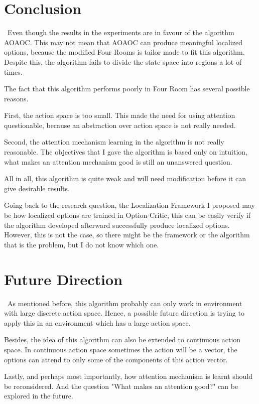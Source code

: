 \documentclass{article}
\begin{document}
	\section{Conclusion}
	\qquad \ Even though the results in the experiments are in favour of the algorithm AOAOC. This may not mean that AOAOC can produce meaningful localized options, because the modified Four Rooms is tailor made to fit this algorithm. Despite this, the algorithm fails to divide the state space into regions a lot of times.
	
	\quad The fact that this algorithm performs poorly in Four Room has several possible reasons.
	
	\quad First, the action space is too small. This made the need for using attention questionable, because an abstraction over action space is not really needed.
	
	\quad Second, the attention mechanism learning in the algorithm is not really reasonable. The objectives that I gave the algorithm is based only on intuition, what makes an attention mechanism good is still an unanswered question.
	
	\quad All in all, this algorithm is quite weak and will need modification before it can give desirable results.
	
	\quad Going back to the research question, the Localization Framework I proposed may be how localized options are trained in Option-Critic, this can be easily verify if the algorithm developed afterward successfully produce localized options. However, this is not the case, so there might be the framework or the algorithm that is the problem, but I do not know which one.
	\section{Future Direction}
	\qquad \ As mentioned before, this algorithm probably can only work in environment with large discrete action space. Hence, a possible future direction is trying to apply this in an environment which has a large action space.
	
	\quad Besides, the idea of this algorithm can also be extended to continuous action space. In continuous action space sometimes the action will be a vector, the options can attend to only some of the components of this action vector.
	
	\quad Lastly, and perhaps most importantly, how attention mechanism is learnt should be reconsidered. And the question "What makes an attention good?" can be explored in the future.
\end{document}

